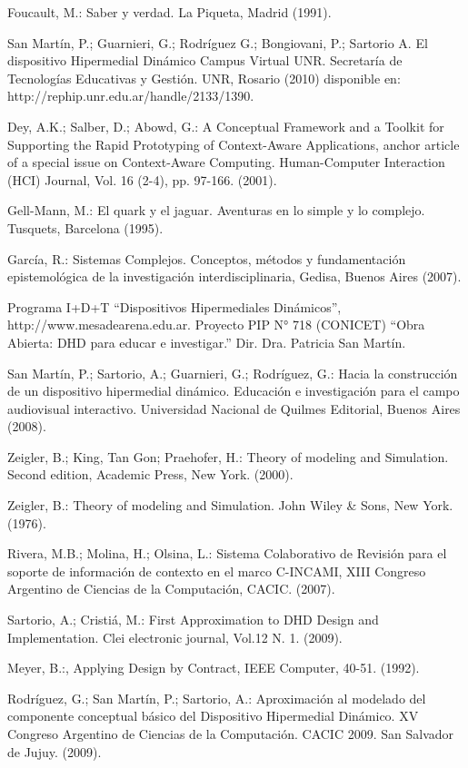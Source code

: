 \begin{thebibliography}{1}
{\bibitem{}
Foucault, M.: Saber y verdad. La Piqueta, Madrid (1991).

\bibitem{}
San Martín, P.; Guarnieri, G.; Rodríguez G.; Bongiovani, P.; Sartorio A. El
dispositivo Hipermedial Dinámico Campus Virtual UNR. Secretaría de Tecnologías
Educativas y Gestión. UNR, Rosario (2010) disponible
en: http://rephip.unr.edu.ar/handle/2133/1390.

\bibitem{}
Dey, A.K.; Salber, D.; Abowd, G.: A Conceptual Framework and a Toolkit for
Supporting the Rapid Prototyping of Context-Aware Applications, anchor article
of a special issue on Context-Aware Computing. Human-Computer Interaction (HCI)
Journal, Vol. 16 (2-4), pp. 97-166. (2001).


\bibitem{}
Gell-Mann, M.: El quark y el jaguar. Aventuras en lo simple y lo complejo.
Tusquets, Barcelona (1995).


\bibitem{}
García, R.: Sistemas Complejos. Conceptos, métodos y fundamentación
epistemológica de la investigación interdisciplinaria, Gedisa, Buenos
Aires (2007).

\bibitem{}
Programa I+D+T “Dispositivos Hipermediales Dinámicos”,
http://www.mesadearena.edu.ar. Proyecto PIP N° 718 (CONICET) “Obra Abierta: DHD
para educar e investigar.” Dir. Dra. Patricia San Martín.


\bibitem{}
San Martín, P.; Sartorio, A.; Guarnieri, G.; Rodríguez, G.: Hacia
la construcción de un dispositivo hipermedial dinámico. Educación e
investigación para el campo audiovisual interactivo. Universidad Nacional de
Quilmes Editorial, Buenos Aires (2008).


\bibitem{}
Zeigler, B.; King, Tan Gon; Praehofer, H.: Theory of modeling and
Simulation. Second edition, Academic Press, New York. (2000).


\bibitem{}
Zeigler, B.: Theory of modeling and Simulation. John Wiley & Sons, New
York. (1976).

\bibitem{}
Rivera, M.B.; Molina, H.; Olsina, L.: Sistema Colaborativo de
Revisión para el soporte de información de contexto en el marco C-INCAMI, XIII
Congreso Argentino de Ciencias de la Computación, CACIC. (2007).

\bibitem{}
Sartorio, A.; Cristiá, M.: First Approximation to DHD Design and
Implementation. Clei electronic journal, Vol.12 N. 1. (2009).

\bibitem{}
Meyer, B.:, Applying Design by Contract, IEEE Computer, 40-51. (1992).

\bibitem{}
Rodríguez, G.; San Martín, P.; Sartorio, A.: Aproximación al modelado
del componente conceptual básico del Dispositivo Hipermedial Dinámico.  XV
Congreso Argentino de Ciencias de la Computación. CACIC 2009. San Salvador de
Jujuy. (2009).


}
\end{thebibliography}
